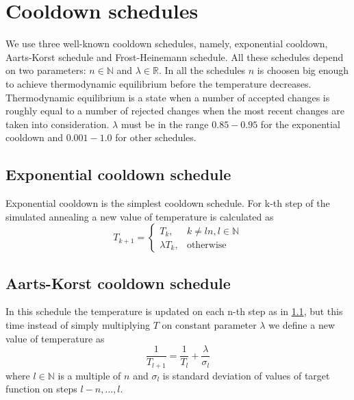 \documentclass[preprint,amsmath,amssymb,aps,pre]{revtex4-1}
\begin{document}
\section{Cooldown schedules}
\label{sec:cooldown}
We use three well-known cooldown schedules, namely, exponential cooldown,
Aarts-Korst schedule \cite{Aarts-Korst }and Frost-Heinemann
\cite{Frost-Heinemann} schedule. All these schedules depend on two parameters:
$n \in \mathbb{N}$ and $\lambda \in \mathbb{R}$. In all the schedules $n$ is
choosen big enough to achieve thermodynamic equilibrium before the temperature
decreases. Thermodynamic equilibrium is a state when a number of accepted
changes is roughly equal to a number of rejected changes when the most recent
changes are taken into consideration. $\lambda$ must be in the range $0.85-0.95$
for the exponential cooldown and $0.001-1.0$ for other schedules.

\subsection{Exponential cooldown schedule}
\label{sec:cooldown-exp}
Exponential cooldown is the simplest cooldown schedule. For k-th step of the
simulated annealing a new value of temperature is calculated as
\begin{equation*}
  T_{k+1} =
  \begin{cases}
    T_k, & k \ne ln, l \in \mathbb{N} \\
    \lambda T_k, & \text{otherwise}
  \end{cases}
\end{equation*}

\subsection{Aarts-Korst cooldown schedule}
\label{sec:cooldown-aarts-korst}
In this schedule the temperature is updated on each n-th step as in
\cref{sec:cooldown-exp}, but this time instead of simply multiplying $T$ on
constant parameter $\lambda$ we define a new value of temperature as
\begin{equation*}
  \frac{1}{T_{l+1}} = \frac{1}{T_l} + \frac{\lambda}{\sigma_l}
\end{equation*}
where $l \in \mathbb{N}$ is a multiple of $n$ and $\sigma_{l}$ is standard
deviation of values of target function on steps $l-n, \dots, l$.
\end{document}
